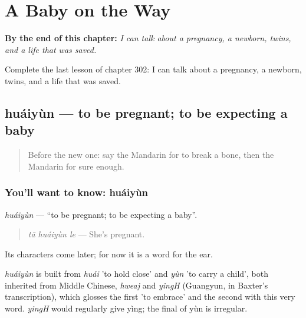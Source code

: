 
\chapter{A Baby on the Way}
\label{ch:zh-a-baby-on-the-way}

\begin{chapteropening}
\textbf{By the end of this chapter:} \emph{I can talk about a pregnancy, a newborn, twins, and a life that was saved.}

Complete the last lesson of chapter 302: I can talk about a pregnancy, a newborn, twins, and a life that was saved.
\end{chapteropening}

\section[huáiyùn]{huáiyùn — to be pregnant; to be expecting a baby}

\label{lesson:ZH-C302-huaiyun}



\begin{quote}
Before the new one: say the Mandarin for to break a bone, then the Mandarin for sure enough.
\end{quote}

\subsection*{You'll want to know: huáiyùn}
\emph{huáiyùn} — \textquotedblleft{}to be pregnant; to be expecting a baby\textquotedblright{}.

\begin{quote}
\emph{tā huáiyùn le} — She's pregnant.
\end{quote}

Its characters come later; for now it is a word for the ear.

\begin{cousinweb}
\emph{huáiyùn} is built from \emph{huái} 'to hold close' and \emph{yùn} 'to carry a child', both inherited from Middle Chinese, \emph{hweaj} and \emph{yingH} (Guangyun, in Baxter's transcription), which glosses the first 'to embrace' and the second with this very word. \emph{yingH} would regularly give yìng; the final of yùn is irregular.
\end{cousinweb}

